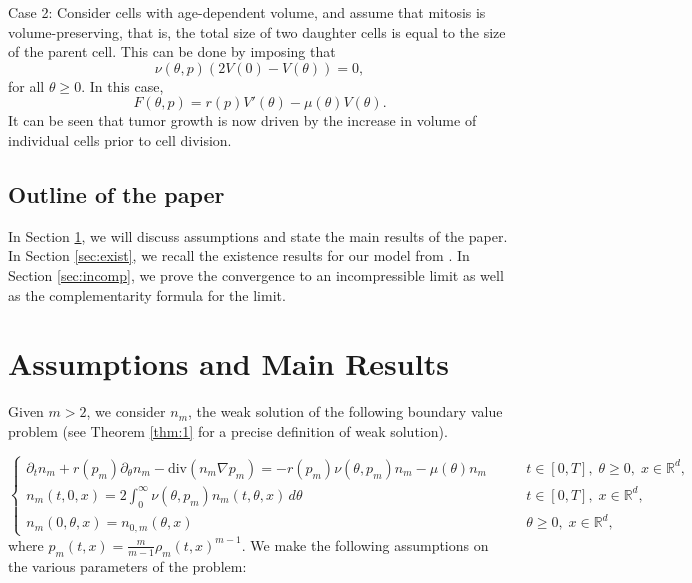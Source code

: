 \documentclass{amsart}
\def\R{\mathbb R}
\begin{document}
Case 2: Consider cells with age-dependent volume, and assume that mitosis is volume-preserving, that is, the total size of two daughter cells is equal to the size of the parent cell. This can be done by imposing that 
$$
\nu(\theta,p)(2V(0)-V(\theta))=0,
$$
for all $\theta\geq 0.$ In this case, 
$$
F(\theta,p)=r(p)V'(\theta)-\mu(\theta)V(\theta).
$$ It can be seen that tumor growth is now driven by the increase in volume of individual cells prior to cell division.

\subsection{Outline of the paper} In Section \ref{sec:statement}, we will discuss assumptions and state the main results of the paper. In Section \ref{sec:exist}, we recall the existence results for our model from \cite{llmw}. In Section \ref{sec:incomp}, we prove the convergence to an incompressible limit as well as the complementarity formula for the limit. 
\section{Assumptions and Main Results}\label{sec:statement}
Given $m>2$, we consider $n_m$, the weak solution of the following boundary value problem (see Theorem \ref{thm:1} for a precise definition of weak solution).

\begin{equation}\label{nm}
    \begin{cases}
        \partial_t n_m+r(p_m)\partial_\theta n_m-\text{div}(n_m \nabla p_m)=-r(p_m)\nu(\theta,p_m)n_m-\mu(\theta)n_m \qquad &t \in [0,T],\; \theta \geq 0,\; x \in \R^d,\\
        n_m(t,0,x)=2\int_{0}^{\infty}\nu(\theta,p_m) n_m(t,\theta,x)\,d\theta \qquad &t \in [0,T],\; x \in \R^d, \\
        n_m(0,\theta,x)=n_{0,m}(\theta,x) \qquad &\theta\geq 0,\; x \in \R^d,
    \end{cases}
\end{equation}
where $p_m(t,x)=\frac{m}{m-1}\rho_m(t,x)^{m-1}.$
We make the following assumptions on the various parameters of the problem:
\end{document}
